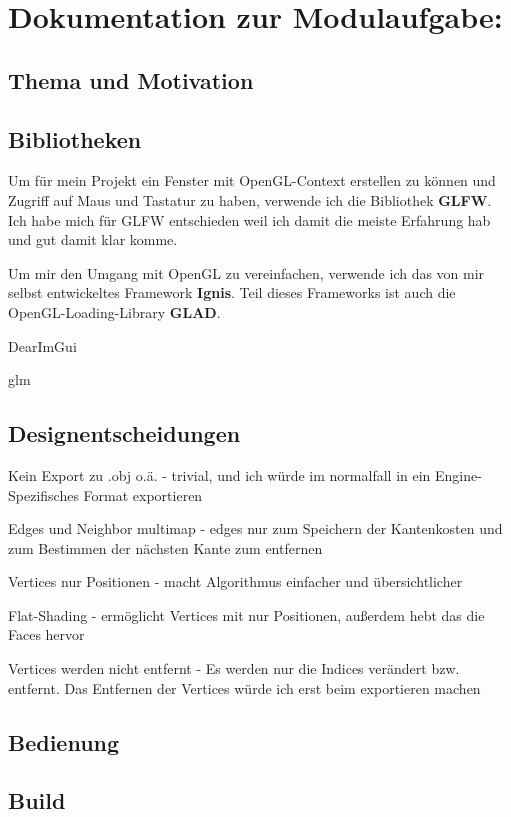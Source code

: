\documentclass[a4paper,12pt]{book}
\begin{document}
\chapter*{Dokumentation zur Modulaufgabe:}

\section*{Thema und Motivation}

\section*{Bibliotheken}

Um für mein Projekt ein Fenster mit OpenGL-Context erstellen zu können und Zugriff auf Maus und Tastatur zu haben, verwende ich die Bibliothek \textbf{GLFW}. Ich habe mich für GLFW entschieden weil ich damit die meiste Erfahrung hab und gut damit klar komme.

Um mir den Umgang mit OpenGL zu vereinfachen, verwende ich das von mir selbst entwickeltes Framework \textbf{Ignis}. Teil dieses Frameworks ist auch die OpenGL-Loading-Library \textbf{GLAD}.

DearImGui

glm

\section*{Designentscheidungen}

Kein Export zu .obj o.ä. - trivial, und ich würde im normalfall in ein Engine-Spezifisches Format exportieren

Edges und Neighbor multimap - edges nur zum Speichern der Kantenkosten und zum Bestimmen der nächsten Kante zum entfernen

Vertices nur Positionen - macht Algorithmus einfacher und übersichtlicher

Flat-Shading - ermöglicht Vertices mit nur Positionen, außerdem hebt das die Faces hervor

Vertices werden nicht entfernt - Es werden nur die Indices verändert bzw. entfernt. Das Entfernen der Vertices würde ich erst beim exportieren machen

\section*{Bedienung}

\section*{Build}
\end{document}
